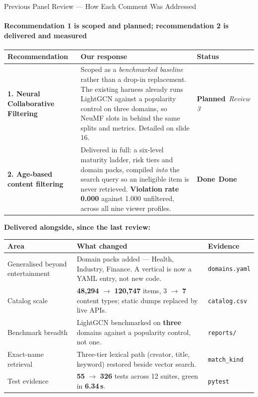 \documentclass[aspectratio=169, 11pt]{beamer}
\newcommand{\sOK}{\textcolor{amritaTeal}{\textbf{Done}}}
\newcommand{\sPLN}{\textcolor{amritaSlate}{\textbf{Planned}}}
\begin{document}
\begin{frame}[shrink]{Previous Panel Review --- How Each Comment Was Addressed}
\framesubtitle{Recommendation 1 is scoped and planned; recommendation 2 is delivered and measured}
\vspace{1mm}
\begin{center}
{\scriptsize
\renewcommand{\arraystretch}{1.45}
\begin{tabular}{p{2.6cm} p{7.6cm} p{2.0cm}}
\toprule
\textbf{Recommendation} & \textbf{Our response} & \textbf{Status}\\
\midrule
\textbf{1. Neural Collaborative Filtering}
  & Scoped as a \emph{benchmarked baseline} rather than a drop-in replacement. The existing harness
    already runs LightGCN against a popularity control on three domains, so NeuMF slots in behind
    the same splits and metrics. Detailed on slide 16.
  & \sPLN\ \textit{Review 3}\\
\textbf{2. Age-based content filtering}
  & Delivered in full: a six-level maturity ladder, risk tiers and domain packs, compiled
    \emph{into} the search query so an ineligible item is never retrieved.
    \textbf{Violation rate 0.000} against 1.000 unfiltered, across all nine viewer profiles.
  & \sOK\ \textbf{Done}\\
\bottomrule
\end{tabular}}
\end{center}
\vspace{2.5mm}
{\scriptsize\textbf{Delivered alongside, since the last review:}}
\vspace{-1mm}
\begin{center}
{\tiny
\renewcommand{\arraystretch}{1.32}
\begin{tabular}{p{2.85cm} p{7.35cm} p{1.95cm}}
\toprule
\textbf{Area} & \textbf{What changed} & \textbf{Evidence}\\
\midrule
Generalised beyond entertainment
  & Domain packs added --- Health, Industry, Finance. A vertical is now a YAML entry, not new code.
  & \texttt{domains.yaml}\\
Catalog scale
  & \textbf{48{,}294} $\rightarrow$ \textbf{120{,}747} items, 3 $\rightarrow$ \textbf{7} content types; static dumps replaced by live APIs.
  & \texttt{catalog.csv}\\
Benchmark breadth
  & LightGCN benchmarked on \textbf{three} domains against a popularity control, not one.
  & \texttt{reports/}\\
Exact-name retrieval
  & Three-tier lexical path (creator, title, keyword) restored beside vector search.
  & \texttt{match\_kind}\\
Test evidence
  & \textbf{55} $\rightarrow$ \textbf{326} tests across 12 suites, green in \textbf{6.34\,s}.
  & \texttt{pytest}\\
\bottomrule
\end{tabular}}
\end{center}
\end{frame}
\end{document}
